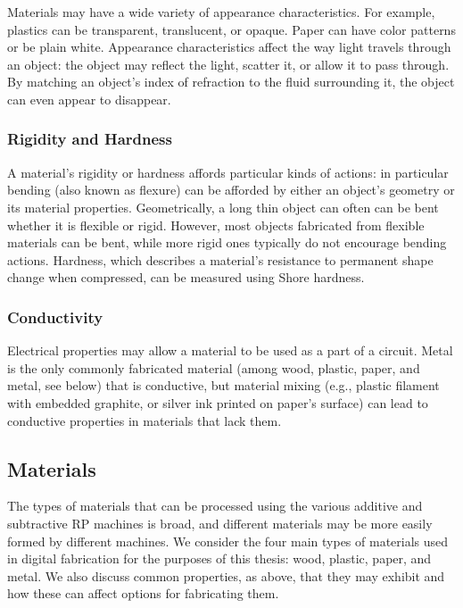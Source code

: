 Materials may have a wide variety of appearance characteristics. For example, plastics can be transparent, translucent, or opaque. Paper can have color patterns or be plain white. Appearance characteristics affect the way light travels through an object: the object may reflect the light, scatter it, or allow it to pass through. By matching an object's index of refraction to the fluid surrounding it, the object can even appear to disappear.

\subsubsection{Rigidity and Hardness}

A material's rigidity or hardness affords particular kinds of actions: in particular bending (also known as flexure) can be afforded by either an object's geometry or its material properties. Geometrically, a long thin object can often can be bent whether it is flexible or rigid.  However, most objects fabricated from flexible materials can be bent, while more rigid ones typically do not encourage bending actions. Hardness, which describes a material's resistance to permanent shape change when compressed, can be measured using Shore hardness.

\subsubsection{Conductivity}

Electrical properties may allow a material to be used as a part of a circuit. Metal is the only commonly fabricated material (among wood, plastic, paper, and metal, see below) that is conductive, but material mixing (e.g., plastic filament with embedded graphite, or silver ink printed on paper's surface) can lead to conductive properties in materials that lack them.

\subsection{Materials}

The types of materials that can be processed using the various additive and subtractive RP machines is broad, and different materials may be more easily formed by different machines. We consider the four main types of materials used in digital fabrication for the purposes of this thesis: wood, plastic, paper, and metal. We also discuss common properties, as above, that they may exhibit and how these can affect options for fabricating them.

